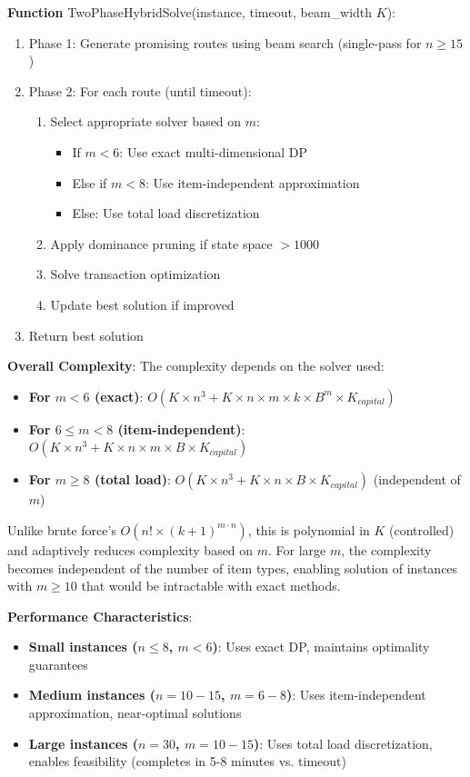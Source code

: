 \documentclass[12pt]{article}
\begin{document}
\textbf{Function} TwoPhaseHybridSolve(instance, timeout, beam\_width $K$):
\begin{enumerate}
    \item Phase 1: Generate promising routes using beam search (single-pass for $n \geq 15$)
    \item Phase 2: For each route (until timeout):
    \begin{enumerate}
        \item Select appropriate solver based on $m$:
        \begin{itemize}
            \item If $m < 6$: Use exact multi-dimensional DP
            \item Else if $m < 8$: Use item-independent approximation
            \item Else: Use total load discretization
        \end{itemize}
        \item Apply dominance pruning if state space $> 1000$
        \item Solve transaction optimization
        \item Update best solution if improved
    \end{enumerate}
    \item Return best solution
\end{enumerate}

\textbf{Overall Complexity}: The complexity depends on the solver used:
\begin{itemize}
    \item \textbf{For $m < 6$ (exact)}: $O(K \times n^3 + K \times n \times m \times k \times B^m \times K_{capital})$
    \item \textbf{For $6 \leq m < 8$ (item-independent)}: $O(K \times n^3 + K \times n \times m \times B \times K_{capital})$
    \item \textbf{For $m \geq 8$ (total load)}: $O(K \times n^3 + K \times n \times B \times K_{capital})$ (independent of $m$)
\end{itemize}

Unlike brute force's $O(n! \times (k+1)^{m \cdot n})$, this is polynomial in $K$ (controlled) and adaptively reduces complexity based on $m$. For large $m$, the complexity becomes independent of the number of item types, enabling solution of instances with $m \geq 10$ that would be intractable with exact methods.

\textbf{Performance Characteristics}:
\begin{itemize}
    \item \textbf{Small instances ($n \leq 8$, $m < 6$)}: Uses exact DP, maintains optimality guarantees
    \item \textbf{Medium instances ($n=10-15$, $m=6-8$)}: Uses item-independent approximation, near-optimal solutions
    \item \textbf{Large instances ($n=30$, $m=10-15$)}: Uses total load discretization, enables feasibility (completes in 5-8 minutes vs. timeout)
\end{itemize}
\end{document}
